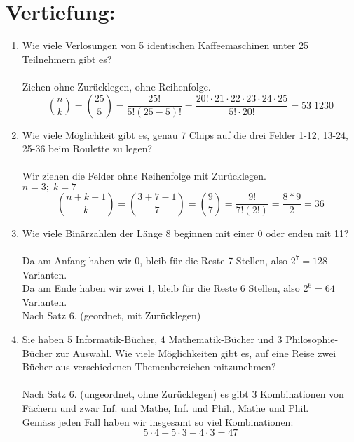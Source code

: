 



	\maketitle
	\section*{Vertiefung:}
	\begin{enumerate}[label=(\alph*)]
		\item  Wie viele Verlosungen von 5 identischen Kaffeemaschinen unter 25 Teilnehmern gibt es?\\\\
		Ziehen ohne Zurücklegen, ohne Reihenfolge.\\	
		$${n \choose k}= {25 \choose 5}= \frac{25!}{5!(25-5)!}= 
		\frac{20!\cdot 21 \cdot 22 \cdot 23 \cdot 24 \cdot 25}{5! \cdot 20!} = 53 \; 1230 $$
		
		\item Wie viele Möglichkeit gibt es, genau 7 Chips auf die drei Felder 1-12, 13-24, 25-36 
        beim Roulette zu legen?\\\\ 
		Wir ziehen die Felder ohne Reihenfolge mit Zur\"ucklegen.\\
		$n=3; \; k=7$ \\
		$$ \binom{n+k-1}{k}= \binom{3+7-1}{7}= \binom{9}{7}=
		\frac{9!}{7!(2!)}= \frac{8*9}{2}=36 $$

		\item Wie viele Binärzahlen der Länge 8 beginnen mit einer 0 oder enden mit 11?\\\\
		Da am Anfang haben wir 0, bleib f\"ur die Reste 7 Stellen, also $2^7 = 128$ Varianten.\\
		Da am Ende haben wir zwei 1, bleib f\"ur die Reste 6 Stellen, also $2^6 = 64$ Varianten.\\
        Nach Satz 6. (geordnet, mit Zur\"ucklegen)

		\item Sie haben 5 Informatik-Bücher, 4 Mathematik-Bücher und 3 Philosophie-Bücher zur
		Auswahl. Wie viele Möglichkeiten gibt es, auf eine Reise zwei Bücher aus verschiedenen
        Themenbereichen mitzunehmen?\\\\
        Nach Satz 6. (ungeordnet, ohne Zur\"ucklegen) es gibt 3 Kombinationen von F\"achern und zwar
        Inf. und Mathe, Inf. und Phil., Mathe und Phil.\\
        Gem\"ass jeden Fall haben wir insgesamt so viel Kombinationen:
        \[5 \cdot 4 + 5 \cdot 3 + 4 \cdot 3 = 47\]


\end{enumerate}
